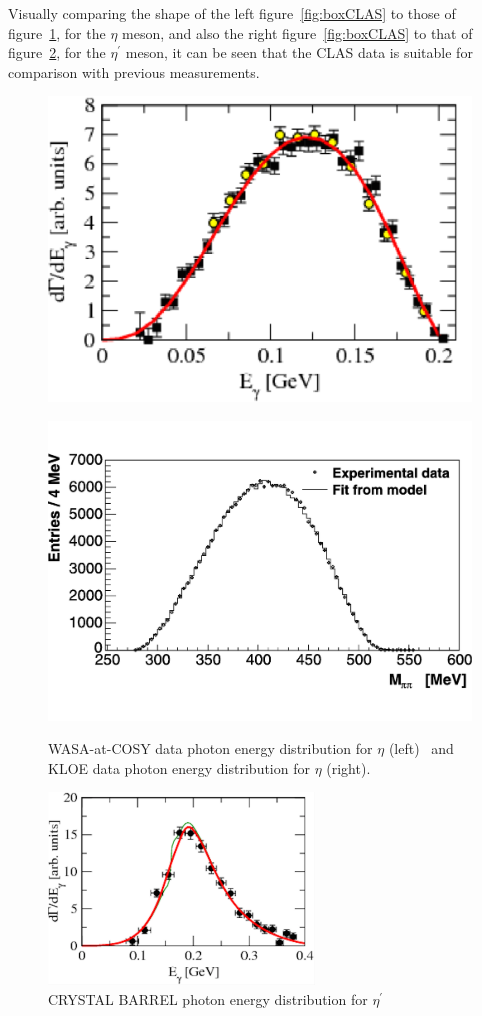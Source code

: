 \documentclass{aip-cp}
\begin{document}
Visually comparing the shape of the left figure~\ref{fig:boxCLAS} to those of figure~\ref{fig:kloe_eta}, for the  $\eta$ meson, and also the right figure~\ref{fig:boxCLAS} to that of figure~\ref{fig:crystal_etaP}, for the $\eta^{\prime}$ meson, it can be seen that the CLAS data is suitable for comparison with previous measurements.
\begin{figure}[h!]
	\begin{minipage}{.5\textwidth}
		\centering
		\centerline{\includegraphics[width=175 pt]{figures/WASA_eta.pdf}}
		\caption{}{}
		\label{fig:wasa_eta}
	\end{minipage}%
	\begin{minipage}{.5\textwidth}
		\centering
		\centerline{\includegraphics[width=200 pt, height = 150 pt]{figures/KLOE_eta.pdf}}
		\caption{WASA-at-COSY data photon energy distribution for $\eta$ (left)~\cite{bib3} and KLOE data photon energy distribution for $\eta$ (right)\cite{bib2}.}{}
		\label{fig:kloe_eta}
	\end{minipage}
\end{figure}
\begin{figure}[h!]
	\centerline{\includegraphics[width=200pt]{figures/CRYSTAL_etaP.pdf}}
	\caption{CRYSTAL BARREL photon energy distribution for  $\eta^{\prime}$~\cite{bib3}}
	\label{fig:crystal_etaP}
\end{figure}
\end{document}
